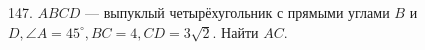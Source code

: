 147. $ABCD$ --- выпуклый четырёхугольник с прямыми углами $B$ и $D,\angle A=45^\circ, BC=4, CD=3\sqrt{2}.$ Найти $AC.$\\
